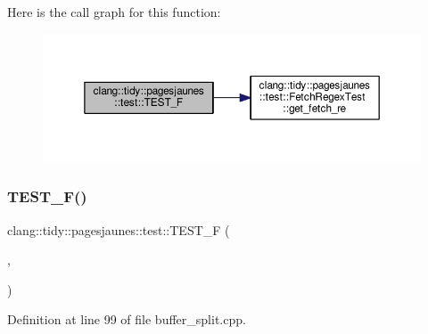 Here is the call graph for this function\+:
\nopagebreak
\begin{figure}[H]
\begin{center}
\leavevmode
\includegraphics[width=350pt]{namespaceclang_1_1tidy_1_1pagesjaunes_1_1test_aaaab9c2cf0aacb3b6638ee3b02fcb33e_cgraph}
\end{center}
\end{figure}
\mbox{\label{namespaceclang_1_1tidy_1_1pagesjaunes_1_1test_a9754e282dd6f8e30e4a45e90cac8e610}} 
\subsubsection{\texorpdfstring{T\+E\+S\+T\+\_\+\+F()}{TEST\_F()}\hspace{0.1cm}{\footnotesize\ttfamily [27/57]}}
{\footnotesize\ttfamily clang\+::tidy\+::pagesjaunes\+::test\+::\+T\+E\+S\+T\+\_\+F (\begin{DoxyParamCaption}\item[{\hyperlink{classclang_1_1tidy_1_1pagesjaunes_1_1test_1_1_buffer_split_test}{Buffer\+Split\+Test}}]{,  }\item[{Nominal\+Buffer\+Split\+Start\+At1}]{ }\end{DoxyParamCaption})}



Definition at line 99 of file buffer\+\_\+split.\+cpp.

